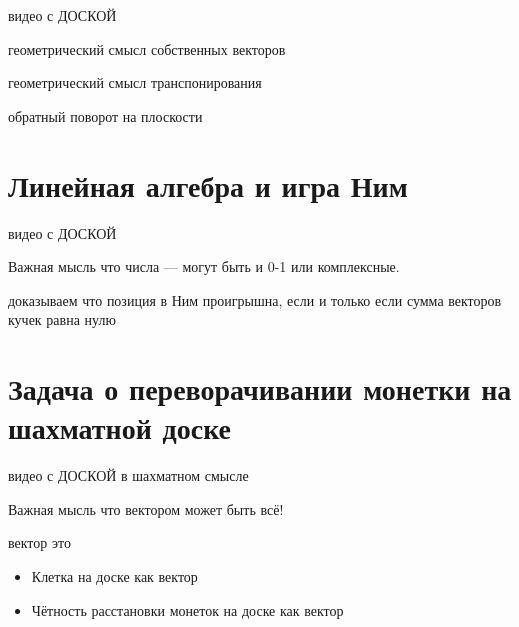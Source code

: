 \documentclass[14pt,xcolor=dvipsnames]{beamer}
\begin{document}
\begin{frame}{видео с ДОСКОЙ}

\begin{block}{геометрический смысл собственных векторов}
\end{block}

\begin{block}{геометрический смысл транспонирования}
\end{block}

\begin{block}{обратный поворот на плоскости}
\end{block}



\end{frame}





\section{Линейная алгебра и игра Ним}
  
\begin{frame}{видео с ДОСКОЙ}

\begin{block}{Важная мысль}
что числа — могут быть и 0-1 или комплексные.
\end{block}


\begin{block}{доказываем}
что позиция в Ним проигрышна, если и только если сумма векторов кучек равна нулю
\end{block}

\end{frame}




\section{Задача о переворачивании монетки на шахматной доске}
  
\begin{frame}{видео с ДОСКОЙ в шахматном смысле}

\begin{block}{Важная мысль}
что вектором может быть всё!
\end{block}
    
\begin{block}{вектор это}
\begin{itemize}
   \item Клетка на доске как вектор
   \item Чётность расстановки монеток на доске как вектор
\end{itemize}
\end{block}


\end{frame}
\end{document}
